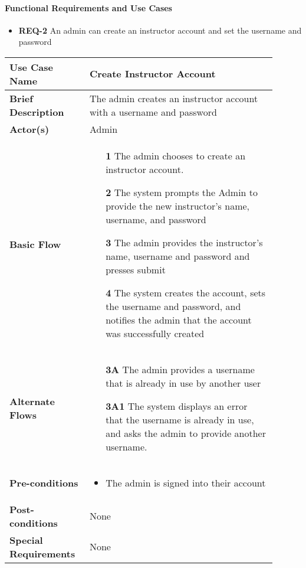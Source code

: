 \documentclass{article}
\begin{document}
\paragraph{Functional Requirements and Use Cases}

\begin{itemize}
  \item \textbf{REQ-2} An admin can create an instructor account and set the username and password
\end{itemize}

\vspace{0.1in}

\begin{tabular}{| p{0.25\linewidth} | p{0.65\linewidth} |}
  \hline
  \textbf{Use Case Name} & Create Instructor Account \\
  \hline
  \textbf{Brief Description} & The admin creates an instructor account with a username and password \\
  \hline
  \textbf{Actor(s)} & Admin \\
  \hline
  \textbf{Basic Flow} & \begin{itemize}
    \item[\textbf{1}] The admin chooses to create an instructor account.
    \item[\textbf{2}] The system prompts the Admin to provide the new instructor's name, username, and password
    \item[\textbf{3}] The admin provides the instructor's name, username and password and presses submit
    \item[\textbf{4}] The system creates the account, sets the username and password, and notifies the admin that the account was successfully created
  \end{itemize}\\
  \hline
  \textbf{Alternate Flows} & \begin{itemize}
    \item[\textbf{3A}] The admin provides a username that is already in use by another user
    \item[\textbf{3A1}] The system displays an error that the username is already in use, and asks the admin to provide another username.
  \end{itemize} \\
  \hline
  \textbf{Pre-conditions} & \begin{itemize}
    \item The admin is signed into their account
  \end{itemize} \\
  \hline
  \textbf{Post-conditions} & None \\
  \hline
  \textbf{Special Requirements} & None \\
  \hline
\end{tabular}
\end{document}
